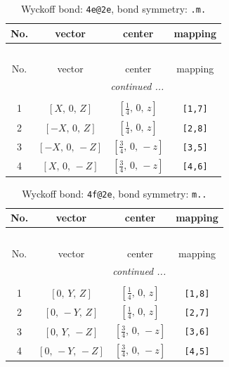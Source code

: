 \documentclass[fleqn,8pt]{jsarticle}
\begin{document}
\renewcommand{\arraystretch}{1.2}
\begin{longtable}{cccc}
\caption{Wyckoff bond: {\tt 4e@2e}, bond symmetry: {\tt .m.}}
 \\
 \hline \hline
No. & vector & center & mapping \\ \hline \endfirsthead

\multicolumn{3}{l}{\tablename\ \thetable{}} \\
 \hline \hline
No. & vector & center & mapping \\ \hline \endhead

 \hline \hline
\multicolumn{3}{r}{\footnotesize\it continued ...} \\ \endfoot

 \hline \hline
\multicolumn{3}{r}{} \\ \endlastfoot

1 & $\left[ X,\, 0,\, Z \right]$ & $\left[ \frac{1}{4},\, 0,\, z \right]$ & {\tt [1,7]} \\ \hline
2 & $\left[ - X,\, 0,\, Z \right]$ & $\left[ \frac{1}{4},\, 0,\, z \right]$ & {\tt [2,8]} \\ \hline
3 & $\left[ - X,\, 0,\, - Z \right]$ & $\left[ \frac{3}{4},\, 0,\, - z \right]$ & {\tt [3,5]} \\ \hline
4 & $\left[ X,\, 0,\, - Z \right]$ & $\left[ \frac{3}{4},\, 0,\, - z \right]$ & {\tt [4,6]} \\
\end{longtable}
\renewcommand{\arraystretch}{1.2}
\begin{longtable}{cccc}
\caption{Wyckoff bond: {\tt 4f@2e}, bond symmetry: {\tt m..}}
 \\
 \hline \hline
No. & vector & center & mapping \\ \hline \endfirsthead

\multicolumn{3}{l}{\tablename\ \thetable{}} \\
 \hline \hline
No. & vector & center & mapping \\ \hline \endhead

 \hline \hline
\multicolumn{3}{r}{\footnotesize\it continued ...} \\ \endfoot

 \hline \hline
\multicolumn{3}{r}{} \\ \endlastfoot

1 & $\left[ 0,\, Y,\, Z \right]$ & $\left[ \frac{1}{4},\, 0,\, z \right]$ & {\tt [1,8]} \\ \hline
2 & $\left[ 0,\, - Y,\, Z \right]$ & $\left[ \frac{1}{4},\, 0,\, z \right]$ & {\tt [2,7]} \\ \hline
3 & $\left[ 0,\, Y,\, - Z \right]$ & $\left[ \frac{3}{4},\, 0,\, - z \right]$ & {\tt [3,6]} \\ \hline
4 & $\left[ 0,\, - Y,\, - Z \right]$ & $\left[ \frac{3}{4},\, 0,\, - z \right]$ & {\tt [4,5]} \\
\end{longtable}
\end{document}
